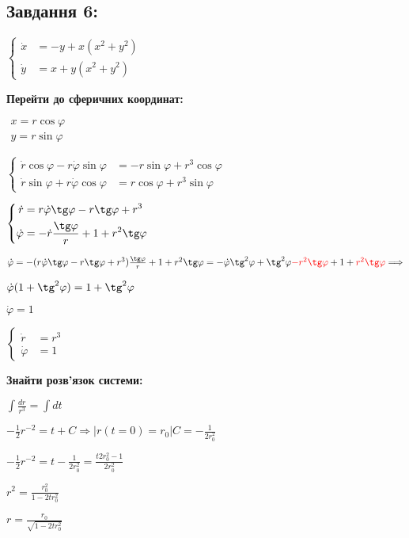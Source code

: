 \subsection{Завдання 6:}
\label{pr1:tsk6}

$\left\{\begin{aligned}
    \dot{x} &= -y + x(x^2 + y^2)\\
    \dot{y} &= x +y(x^2 + y^2) 
\end{aligned}\right.$

\textbf{Перейти до сферичних координат:}

$\begin{aligned}
    x= r\cos\varphi\\
    y = r\sin\varphi
\end{aligned}$

$\left\{\begin{aligned}
    \dot{r}\cos\varphi - r\dot{\varphi}\sin\varphi &= -r\sin\varphi + r^3\cos\varphi\\
    \dot{r}\sin\varphi + r\dot{\varphi}\cos\varphi &= r\cos\varphi +r^3\sin\varphi 
\end{aligned}\right.$

$\left\{\begin{aligned}
    \dot{r} &= r\dot{\varphi}\tg\varphi -r\tg\varphi + r^3\\
    \dot{\varphi} &= -\dot{r}\frac{\tg\varphi}{r} + 1 +r^2\tg\varphi 
\end{aligned}\right.$

$\dot{\varphi} = -(r\dot{\varphi}\tg\varphi -r\tg\varphi + r^3)\frac{\tg\varphi}{r} + 1 +r^2\tg\varphi = 
-\dot{\varphi}\tg^2\varphi + \tg^2\varphi \textcolor{red}{- r^2\tg\varphi} + 1 + \textcolor{red}{r^2\tg\varphi} \Longrightarrow$

$\dot{\varphi}(1 + \tg^2\varphi) = 1 + \tg^2\varphi$

$\dot{\varphi} = 1$

$\left\{\begin{aligned}
    \dot{r} &= r^3\\
    \dot{\varphi} &= 1
\end{aligned}\right.$

\textbf{Знайти розв'язок системи:}

$\int \frac{dr}{r^3} = \int dt$

$-\frac{1}{2}r^{-2} = t + C \Longrightarrow \Bigg | r(t = 0) = r_0 \Bigg | C = -\frac{1}{2r^2_0}$ 


$-\frac{1}{2}r^{-2} = t - \frac{1}{2r^2_0} = \frac{t2r^2_0 - 1}{2r^2_0}$

$r^2 = \frac{r^2_0}{1-2tr^2_0}$



$r = \frac{r_0}{\sqrt{1-2tr^2_0}}$